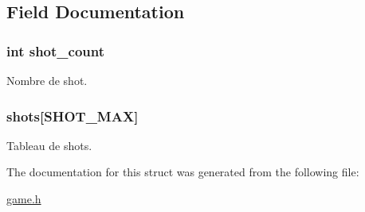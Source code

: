 \subsection{Field Documentation}
\subsubsection[{\texorpdfstring{shot\+\_\+count}{shot_count}}]{\setlength{\rightskip}{0pt plus 5cm}int shot\+\_\+count}\hypertarget{struct_shot__list_a4276a0b800a4ef69dcbfeb381d1e7346}{}\label{struct_shot__list_a4276a0b800a4ef69dcbfeb381d1e7346}
Nombre de shot. 
\subsubsection[{\texorpdfstring{shots}{shots}}]{ shots\mbox{[}S\+H\+O\+T\+\_\+\+M\+AX\mbox{]}}\hypertarget{struct_shot__list_a08606c51a264817a56f8af413248fa37}{}\label{struct_shot__list_a08606c51a264817a56f8af413248fa37}
Tableau de shots. 

The documentation for this struct was generated from the following file\+:\begin{DoxyCompactItemize}
\item 
\hyperlink{game_8h}{game.\+h}\end{DoxyCompactItemize}
